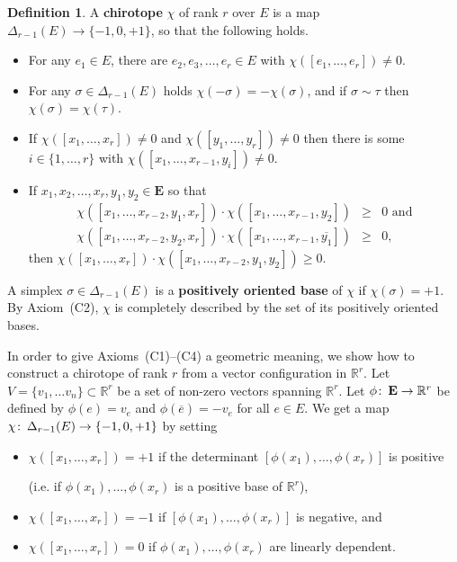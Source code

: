 \documentclass[a4paper]{amsart}
\def\co{\colon\thinspace}
\newcommand{\begriff}[1]{\textbf{#1}}
\theoremstyle{definition}
\newtheorem{definition}{Definition}
\theoremstyle{remark}
\begin{document}
\begin{definition}
  A \begriff{chirotope} $\chi$ of rank $r$ over $E$ is a map
  $\Delta_{r-1}(E) \to \{-1,0,+1\}$, so that the following holds.
  \begin{itemize}
  \item[(C1)] For any $e_1\in E$, there are $e_2,e_3,\dots,e_{r}\in E$
    with $\chi([ e_1,\dots, e_r])\not=0$.
  \item[(C2)] For any $\sigma\in \Delta_{r-1}(E)$ holds $\chi(-\sigma)
    = -\chi(\sigma)$, and if $\sigma\sim \tau$ then $\chi(\sigma) =
    \chi(\tau)$.
  \item[(C3)] If $\chi([x_1,\dots,x_r])\not=0$ and
    $\chi([y_1,\dots,y_r])\not=0$ then there is some
    $i\in\{1,\dots,r\}$ with $\chi([x_1,\dots,x_{r-1}, y_i])\not=0$.
  \item[(C4)] If
    $x_1,x_2,\dots, x_r, y_1,y_2\in \mathbf E$ so that
    \begin{eqnarray*}
        \chi([x_1,\dots,x_{r-2},y_1,x_r])\cdot \chi([x_1,\dots,x_{r-1},y_2])
        &\ge& 0\text{ and}\\
        \chi([x_1,\dots,x_{r-2},y_2,x_r]) \cdot 
        \chi([x_1,\dots,x_{r-1},\overline{y_1}])&\ge& 0,
    \end{eqnarray*}
 then $\chi([x_1,\dots,x_r])\cdot\chi([x_1,\dots,x_{r-2},y_1,y_2])\ge 0$.
  \end{itemize}
\end{definition}

\noindent
A simplex $\sigma\in\Delta_{r-1}(E)$ is a \begriff{positively oriented
  base} of $\chi$ if $\chi(\sigma) = +1$.  
By Axiom~(C2), $\chi$ is completely described by the set of its positively 
oriented bases.


In order to give Axioms~(C1)--(C4) a
geometric meaning, we show how to construct a chirotope of rank $r$ from a 
vector configuration in $\mathbb R^r$.
%
Let $V=\{v_1,\dots v_n\}\subset \mathbb R^{r}$ be a set of non-zero vectors
spanning $\mathbb R^{r}$. Let $\phi\co \mathbf E\to \mathbb R^{r}$ be
defined by $\phi(e) = v_e$ and $\phi(\overline e) = -v_e$ for all $e\in
E$.  We get a map $\chi\co \Delta_{r-1}(E) \to \{-1,0,+1\}$ by setting
\begin{itemize}
\item $\chi([x_1,\dots,x_r])=+1$ if the determinant
  $[\phi(x_1),\dots,\phi(x_r)]$ is positive 

\noindent  (i.e. if
  $\phi(x_1),\dots,\phi(x_r)$ is a positive base of $\mathbb R^{r}$),
\item $\chi([x_1,\dots,x_r]) = -1$ if $[\phi(x_1),\dots,\phi(x_r)]$
  is negative, and
\item $\chi([x_1,\dots,x_r]) =0$ if $\phi(x_1),\dots,\phi(x_r)$ are
  linearly dependent.
\end{itemize}
\end{document}
